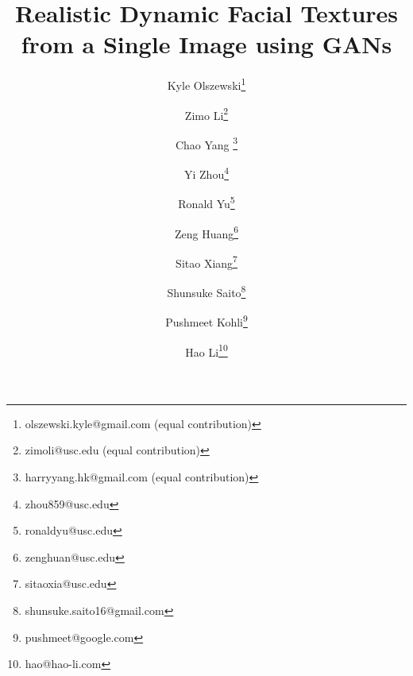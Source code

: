 \documentclass[10pt,twocolumn,letterpaper]{article}
\begin{document}
\title{Realistic Dynamic Facial Textures from a Single Image using GANs}


\author[1,3,4]{Kyle Olszewski\thanks{olszewski.kyle@gmail.com (equal contribution)}}
\author[1]{Zimo Li\thanks{zimoli@usc.edu (equal contribution)}}
\author[1]{Chao Yang \thanks{harryyang.hk@gmail.com (equal contribution)}}
\author[1]{Yi Zhou\thanks{zhou859@usc.edu}}
\author[1,3]{Ronald Yu\thanks{ronaldyu@usc.edu}}
\author[1]{Zeng Huang\thanks{zenghuan@usc.edu}}
\author[1]{Sitao Xiang\thanks{sitaoxia@usc.edu}}
\author[1,3]{Shunsuke Saito\thanks{shunsuke.saito16@gmail.com}}
\author[2]{Pushmeet Kohli\thanks{pushmeet@google.com}}
\author[1,3,4]{Hao Li\thanks{hao@hao-li.com}}

\maketitle
\thispagestyle{empty}
\end{document}
